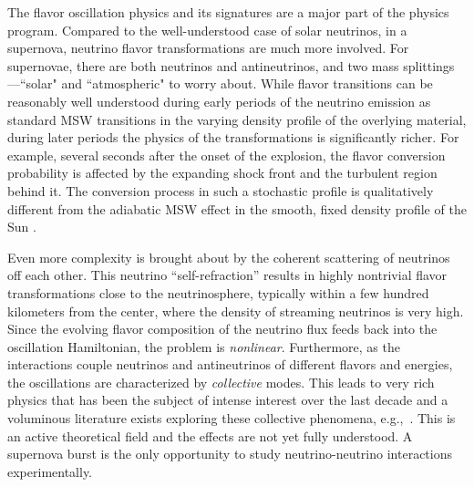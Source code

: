 The flavor oscillation physics and its signatures are a major part of
the physics program. Compared to the well-understood case of solar
neutrinos, in a supernova, neutrino flavor transformations are much
more involved. For supernovae, there are both neutrinos and antineutrinos, and
two mass splittings---``solar" and ``atmospheric" to worry about.
While flavor transitions can be reasonably well understood during 
early periods of the neutrino emission as standard MSW
transitions in the varying density profile of the overlying material, during
later periods the physics of the transformations is significantly richer.
For example, several seconds after the onset of the explosion, the
flavor conversion probability is affected by the expanding shock front
and the turbulent region behind it. The conversion process in such a
stochastic profile is qualitatively different from the adiabatic MSW
effect in the smooth, fixed density profile of the Sun . 

Even more complexity is brought about by the coherent scattering of neutrinos off each other. This neutrino ``self-refraction'' 
 results in highly nontrivial flavor transformations close to the neutrinosphere, typically within a few hundred kilometers from the center, where the density of streaming neutrinos is very high. Since the evolving flavor composition of the neutrino flux feeds back into the oscillation Hamiltonian, the problem is \emph{nonlinear}. Furthermore, as the interactions couple neutrinos and antineutrinos of different flavors and energies, the oscillations are characterized by \emph{collective} modes.    This leads to very rich physics that has been the subject of intense interest over the last decade and a voluminous literature exists exploring these collective phenomena,
e.g.,~\cite{Duan:2005cp,Fogli:2007bk,Raffelt:2007cb,Raffelt:2007xt,EstebanPretel:2008ni,Duan:2009cd,Dasgupta:2009mg,Duan:2010bg,Duan:2010bf,Wu:2014kaa}.  This is an active theoretical field and the effects are not yet fully understood. A supernova burst is the only opportunity to study neutrino-neutrino interactions experimentally.


